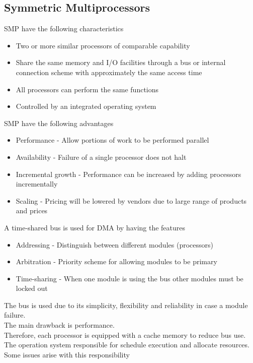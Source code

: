 \documentclass[12pt, a4paper]{article}
\begin{document}
		\subsection{Symmetric Multiprocessors}
			SMP have the following characteristics
			\begin{itemize}
				\item Two or more similar processors of comparable capability
				\item Share the same memory and I/O facilities through a bus or internal connection scheme with approximately the same access time
				\item All processors can perform the same functions
				\item Controlled by an integrated operating system
			\end{itemize}
			SMP have the following advantages
			\begin{itemize}
				\item Performance - Allow portions of work to be performed parallel
				\item Availability - Failure of a single processor does not halt
				\item Incremental growth - Performance can be increased by adding processors incrementally
				\item Scaling - Pricing will be lowered by vendors due to large range of products and prices
			\end{itemize}
			A time-shared bus is used for DMA by having the features
			\begin{itemize}
				\item Addressing - Distinguish between different modules (processors)
				\item Arbitration - Priority scheme for allowing modules to be primary
				\item Time-sharing - When one module is using the bus other modules must be locked out
			\end{itemize}
			The bus is used due to its simplicity, flexibility and reliability in case a module failure.\\
			The main drawback is performance.\\
			Therefore, each processor is equipped with a cache memory to reduce bus use.\\
			The operation system responsible for schedule execution and allocate resources.\\
			Some issues arise with this responsibility
\end{document}
